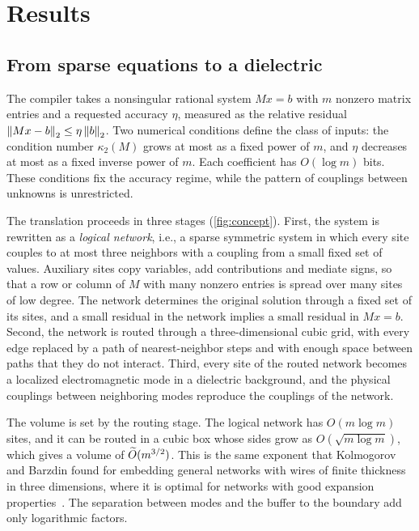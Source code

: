 \section{Results}

\subsection{From sparse equations to a dielectric}

The compiler takes a nonsingular rational system $Mx=b$ with $m$ nonzero
matrix entries and a requested accuracy $\eta$, measured as the relative
residual $\left\lVert Mx-b\right\rVert_2\le\eta\left\lVert b\right\rVert_2$. Two numerical conditions define the
class of inputs: the condition number $\kappa_2(M)$ grows at most as a fixed
power of $m$, and $\eta$ decreases at most as a fixed inverse power of $m$.
Each coefficient has $O(\log m)$ bits. These conditions fix the accuracy
regime, while the pattern of couplings between unknowns is unrestricted.

The translation proceeds in three stages (\cref{fig:concept}). First, the
system is rewritten as a \emph{logical network}, i.e., a sparse symmetric
system in which every site couples to at most three neighbors with a coupling
from a small fixed set of values. Auxiliary sites copy variables, add
contributions and mediate signs, so that a row or column of $M$ with many
nonzero entries is spread over many sites of low degree. The network
determines the original solution through a fixed set of its sites, and a small
residual in the network implies a small residual in $Mx=b$. Second, the network
is routed through a three-dimensional cubic grid, with every edge replaced by a
path of nearest-neighbor steps and with enough space between paths that they
do not interact. Third, every site of the routed network becomes a localized
electromagnetic mode in a dielectric background, and the physical couplings between
neighboring modes reproduce the couplings of the network.

The volume is set by the routing stage. The logical network has
$O(m\log m)$ sites, and it can be routed in a cubic box whose sides grow as
$O(\sqrt{m\log m})$, which gives a volume of $\widetilde O(m^{3/2})$. This is the same exponent that Kolmogorov and
Barzdin found for embedding general networks with wires of finite thickness in
three dimensions, where it is optimal for networks with good expansion
properties~\citep{KolmogorovBarzdin1967,GromovGuth2012}. The separation between
modes and the buffer to the boundary add only logarithmic factors.

